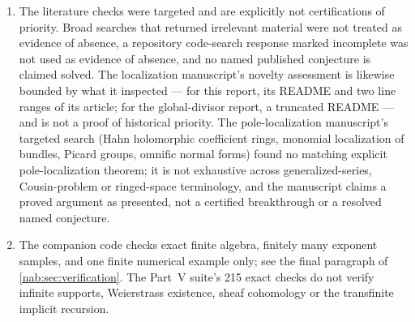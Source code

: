 \documentclass[11pt,letterpaper]{article}
\theoremstyle{definition}
\theoremstyle{remark}
\numberwithin{equation}{section}
\begin{document}
\begin{enumerate}
\item\label{nab:nc:priority}
The literature checks were targeted and are explicitly not certifications of
priority. Broad searches that returned irrelevant material were not treated as
evidence of absence, a repository code-search response marked incomplete was
not used as evidence of absence, and no named published conjecture is claimed
solved. The localization manuscript's novelty assessment is likewise bounded
by what it inspected --- for this report, its README and two line ranges of its
article; for the global-divisor report, a truncated README --- and is not a
proof of historical priority. The pole-localization manuscript's targeted
search (Hahn holomorphic coefficient rings, monomial localization of bundles,
Picard groups, omnific normal forms) found no matching explicit
pole-localization theorem; it is not exhaustive across generalized-series,
Cousin-problem or ringed-space terminology, and the manuscript claims a proved
argument as presented, not a certified breakthrough or a resolved named
conjecture.

\item\label{nab:nc:code}
The companion code checks exact finite algebra, finitely many exponent
samples, and one finite numerical example only; see the final paragraph of
\cref{nab:sec:verification}. The Part~V suite's 215 exact checks do not verify
infinite supports, Weierstrass existence, sheaf cohomology or the transfinite
implicit recursion.


\end{enumerate}
\end{document}
